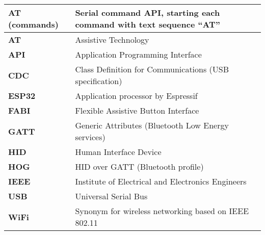 \documentclass[]{scrreprt}%
\begin{document}
 \begin{tabularx}{\textwidth}{|l|X|} \hline
 \textbf{AT (commands)}   &   Serial command API, starting each command with text sequence ``AT''\\ \hline
 \textbf{AT}    &   Assistive Technology \\ \hline
 \textbf{API}   &   Application Programming Interface      \\ \hline
 \textbf{CDC}   &   Class Definition for Communications (USB specification) \\ \hline
 \textbf{ESP32} &   Application processor by Espressif \\ \hline
 \textbf{FABI}  &   Flexible Assistive Button Interface \\ \hline
 \textbf{GATT}  &   Generic Attributes (Bluetooth Low Energy services) \\ \hline
 \textbf{HID}   &   Human Interface Device      \\ \hline
 \textbf{HOG}   &   HID over GATT (Bluetooth profile) \\ \hline
 \textbf{IEEE}  &   Institute of Electrical and Electronics Engineers \\ \hline
 \textbf{USB}   &   Universal Serial Bus \\ \hline
 \textbf{WiFi}  &   Synonym for wireless networking based on IEEE 802.11 \\ \hline
 \end{tabularx}
\end{document}
